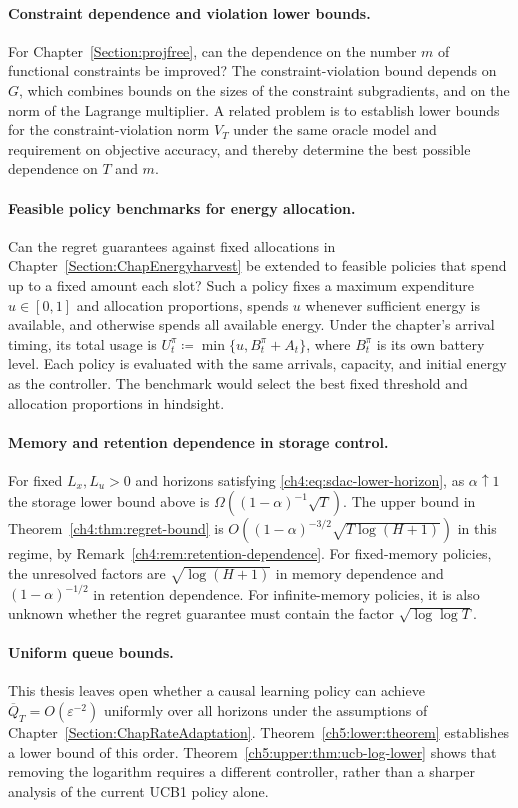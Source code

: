 \paragraph{Constraint dependence and violation lower bounds.}
For Chapter~\ref{Section:projfree}, can the dependence on the number $m$
of functional constraints be improved? The constraint-violation bound depends
on $G$, which combines bounds on the sizes of the constraint subgradients,
and on the norm of the Lagrange multiplier.
A related problem is to establish lower bounds for the constraint-violation
norm $V_T$ under the same oracle model and requirement on objective accuracy,
and thereby determine the best possible dependence on $T$ and $m$.

\paragraph{Feasible policy benchmarks for energy allocation.}
Can the regret guarantees against fixed allocations in
Chapter~\ref{Section:ChapEnergyharvest} be extended to feasible
policies that spend up to a fixed amount each slot? Such a policy
fixes a maximum expenditure $u\in[0,1]$ and allocation proportions,
spends $u$ whenever sufficient energy is available, and otherwise spends
all available energy. Under the chapter's arrival timing, its total usage
is $U_t^\pi\coloneqq\min\{u,B_t^\pi+A_t\}$, where $B_t^\pi$ is its own battery
level. Each policy is evaluated with the same arrivals, capacity, and
initial energy as the controller. The benchmark would select the best
fixed threshold and allocation proportions in hindsight.

\paragraph{Memory and retention dependence in storage control.}
For fixed $L_x,L_u>0$ and horizons satisfying
\eqref{ch4:eq:sdac-lower-horizon}, as $\alpha\uparrow1$ the storage
lower bound above is $\Omega((1-\alpha)^{-1}\sqrt T)$.
The upper bound in Theorem~\ref{ch4:thm:regret-bound} is
$O((1-\alpha)^{-3/2}\sqrt{T\log(H+1)})$ in this regime, by
Remark~\ref{ch4:rem:retention-dependence}.
For fixed-memory policies, the unresolved factors are
$\sqrt{\log(H+1)}$ in memory dependence and $(1-\alpha)^{-1/2}$ in
retention dependence. For infinite-memory policies, it is also unknown
whether the regret guarantee must contain the factor
$\sqrt{\log\log T}$.

\paragraph{Uniform queue bounds.}
This thesis leaves open whether a causal learning policy can achieve
$\overline Q_T=O(\varepsilon^{-2})$ uniformly over all horizons under the
assumptions of Chapter~\ref{Section:ChapRateAdaptation}.
Theorem~\ref{ch5:lower:theorem} establishes a lower bound of this order.
Theorem~\ref{ch5:upper:thm:ucb-log-lower} shows that removing the logarithm
requires a different controller, rather than a sharper analysis of the
current UCB1 policy alone.

